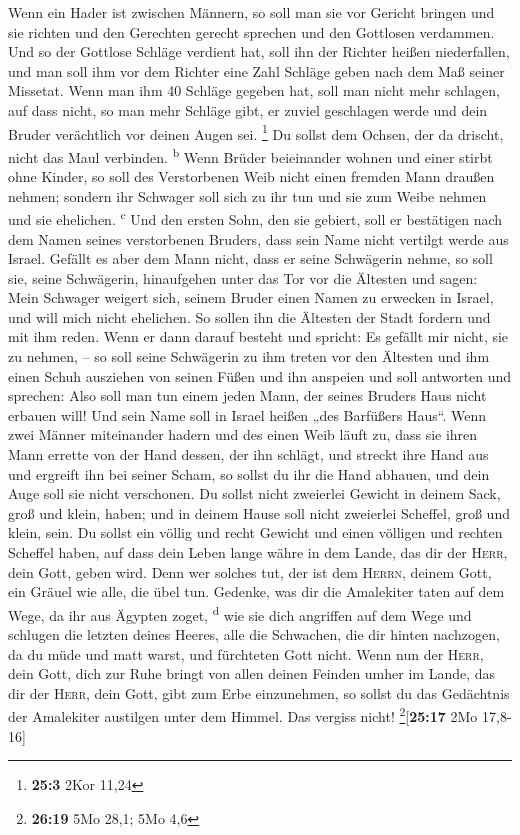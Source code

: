  Wenn ein Hader ist zwischen Männern, so soll man sie vor
Gericht bringen und sie richten und den Gerechten gerecht sprechen und
den Gottlosen verdammen.  Und so der Gottlose Schläge
verdient hat, soll ihn der Richter heißen niederfallen, und man soll ihm
vor dem Richter eine Zahl Schläge geben nach dem Maß seiner Missetat.
 Wenn man ihm 40 Schläge gegeben hat, soll man nicht mehr
schlagen, auf dass nicht, so man mehr Schläge gibt, er zuviel geschlagen
werde und dein Bruder verächtlich vor deinen Augen sei. \footnote{\textbf{25:3}
  2Kor 11,24}  Du sollst dem Ochsen, der da drischt, nicht
das Maul verbinden. \textsuperscript{b}  Wenn Brüder
beieinander wohnen und einer stirbt ohne Kinder, so soll des
Verstorbenen Weib nicht einen fremden Mann draußen nehmen; sondern ihr
Schwager soll sich zu ihr tun und sie zum Weibe nehmen und sie
ehelichen. \textsuperscript{c}  Und den ersten Sohn, den
sie gebiert, soll er bestätigen nach dem Namen seines verstorbenen
Bruders, dass sein Name nicht vertilgt werde aus Israel. 
Gefällt es aber dem Mann nicht, dass er seine Schwägerin nehme, so soll
sie, seine Schwägerin, hinaufgehen unter das Tor vor die Ältesten und
sagen: Mein Schwager weigert sich, seinem Bruder einen Namen zu erwecken
in Israel, und will mich nicht ehelichen.  So sollen ihn
die Ältesten der Stadt fordern und mit ihm reden. Wenn er dann darauf
besteht und spricht: Es gefällt mir nicht, sie zu nehmen, --
 so soll seine Schwägerin zu ihm treten vor den Ältesten
und ihm einen Schuh ausziehen von seinen Füßen und ihn anspeien und soll
antworten und sprechen: Also soll man tun einem jeden Mann, der seines
Bruders Haus nicht erbauen will!  Und sein Name soll in
Israel heißen „des Barfüßers Haus``.  Wenn zwei Männer
miteinander hadern und des einen Weib läuft zu, dass sie ihren Mann
errette von der Hand dessen, der ihn schlägt, und streckt ihre Hand aus
und ergreift ihn bei seiner Scham,  so sollst du ihr die
Hand abhauen, und dein Auge soll sie nicht verschonen. 
Du sollst nicht zweierlei Gewicht in deinem Sack, groß und klein, haben;
 und in deinem Hause soll nicht zweierlei Scheffel, groß
und klein, sein.  Du sollst ein völlig und recht Gewicht
und einen völligen und rechten Scheffel haben, auf dass dein Leben lange
währe in dem Lande, das dir der \textsc{Herr}, dein Gott, geben wird.
 Denn wer solches tut, der ist dem \textsc{Herrn}, deinem
Gott, ein Gräuel wie alle, die übel tun.  Gedenke, was
dir die Amalekiter taten auf dem Wege, da ihr aus Ägypten zoget,
\textsuperscript{d}  wie sie dich angriffen auf dem Wege
und schlugen die letzten deines Heeres, alle die Schwachen, die dir
hinten nachzogen, da du müde und matt warst, und fürchteten Gott nicht.
 Wenn nun der \textsc{Herr}, dein Gott, dich zur Ruhe
bringt von allen deinen Feinden umher im Lande, das dir der
\textsc{Herr}, dein Gott, gibt zum Erbe einzunehmen, so sollst du das
Gedächtnis der Amalekiter austilgen unter dem Himmel. Das vergiss nicht!
\footnote{\textbf{26:19} 5Mo 28,1; 5Mo 4,6}{[}\textbf{25:17} 2Mo
17,8-16{]}


